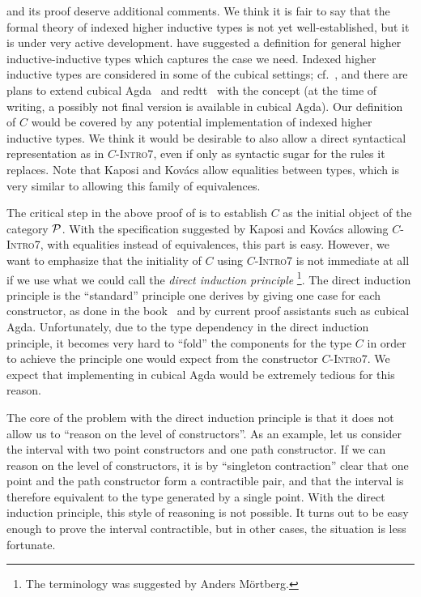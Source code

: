 \begin{remark} \label{remark:generalized-squid}
 and its proof 
deserve additional comments.
We think it is fair to say that the formal theory of indexed higher inductive
types is not yet well-established, but it is under very active development.
\citet{kaposi_et_al:LIPIcs:2018:9190,AAhiits} have
suggested a definition for general higher inductive-inductive types which captures
the case we need.
Indexed higher inductive types are considered in some of the cubical settings;
cf.\ \citet{cavallo2019higher}, and there are plans to extend
cubical Agda~\citep{andrea:cubicalagda,anders:cubicalblog,andreaAnders:experiments}
and redtt~\citep{redtt} with the concept (at the time of writing, a possibly not
final version is available in cubical Agda).
Our definition of $C$ would be covered by any potential implementation of
indexed higher inductive types.
We think it would be desirable to also allow a direct syntactical representation as
in
\textsc{$C$-Intro7}, even if only as syntactic sugar
for the rules it replaces.
Note that Kaposi and Kov{\'a}cs allow equalities between types,
which is very similar to allowing this family of equivalences.

The critical step in the above proof of  is to establish
$C$ as the initial object of the
category $\mathcal P$.
With the specification suggested by Kaposi and Kov{\'a}cs allowing
\textsc{$C$-Intro7}, with equalities instead of
equivalences, this part is easy.
However, we want to emphasize that the initiality of
$C$ using \textsc{$C$-Intro7}
is not immediate at all if we use what we could call the
\emph{direct induction principle}
\footnote{The terminology was suggested by Anders M\"ortberg.}.
The direct induction principle is the ``standard'' principle one derives by
giving one case for each constructor, as done in the book~
and by current proof assistants such as cubical Agda.
Unfortunately, due to the type dependency in the direct induction principle,
it becomes very hard to ``fold'' the components for the type
$C$ in order to achieve the principle one
would expect from the constructor \textsc{$C$-Intro7}.
We expect that implementing  in cubical Agda would be
extremely tedious for this reason.

The core of the problem with the direct induction principle is that it does not
allow us to ``reason on the level of constructors''.
As an example, let us consider the interval with two point constructors and one
path constructor.
If we can reason on the level of constructors, it is by ``singleton contraction''
clear that one point and the path constructor form a contractible pair, and that
the interval is therefore equivalent to the type generated by a single point.
With the direct induction principle, this style of reasoning is not possible.
It turns out to be easy enough to prove the interval contractible, but  in other
cases, the situation is less fortunate.


\end{remark}
